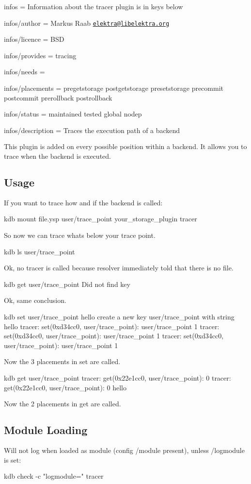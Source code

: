 
\begin{DoxyItemize}
\item infos = Information about the tracer plugin is in keys below
\item infos/author = Markus Raab \href{mailto:elektra@libelektra.org}{\tt elektra@libelektra.\+org}
\item infos/licence = B\+S\+D
\item infos/provides = tracing
\item infos/needs =
\item infos/placements = pregetstorage postgetstorage presetstorage precommit postcommit prerollback postrollback
\item infos/status = maintained tested global nodep
\item infos/description = Traces the execution path of a backend
\end{DoxyItemize}

This plugin is added on every possible position within a backend. It allows you to trace when the backend is executed.

\subsection*{Usage}

If you want to trace how and if the backend is called\+: \begin{DoxyVerb}kdb mount file.ysp user/trace_point your_storage_plugin tracer
\end{DoxyVerb}


So now we can trace whats below your trace point. \begin{DoxyVerb}kdb ls user/trace_point
\end{DoxyVerb}


Ok, no tracer is called because resolver immediately told that there is no file. \begin{DoxyVerb}kdb get user/trace_point
Did not find key
\end{DoxyVerb}


Ok, same conclusion. \begin{DoxyVerb}kdb set user/trace_point hello
create a new key user/trace_point with string hello
tracer: set(0xd34cc0, user/trace_point): user/trace_point 1
tracer: set(0xd34cc0, user/trace_point): user/trace_point 1
tracer: set(0xd34cc0, user/trace_point): user/trace_point 1
\end{DoxyVerb}


Now the 3 placements in set are called. \begin{DoxyVerb}kdb get user/trace_point
tracer: get(0x22e1cc0, user/trace_point): 0
tracer: get(0x22e1cc0, user/trace_point): 0
hello
\end{DoxyVerb}


Now the 2 placements in get are called.

\subsection*{Module Loading}

Will not log when loaded as module (config {\ttfamily /module} present), unless {\ttfamily /logmodule} is set\+: \begin{DoxyVerb}kdb check -c "logmodule=" tracer\end{DoxyVerb}
 